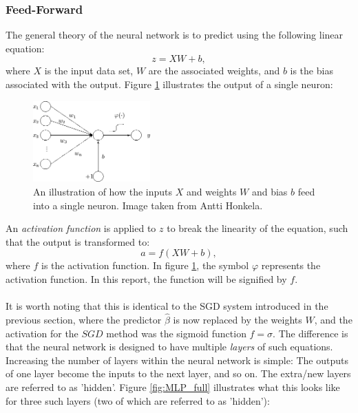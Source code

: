         \subsubsection{Feed-Forward}
            The general theory of the neural network is to predict using the following linear equation:
            \begin{equation}\label{eq:z1}
                z = X W + b,
            \end{equation}
            where $X$ is the input data set, $W$ are the associated weights, and $b$ is the bias associated with the output. Figure \ref{fig:MLP_conc} illustrates the output of a single neuron:
            \begin{figure}[H]
                \centering
                \includegraphics[width=0.4\textwidth]{figures/MLP.png}
                \caption{An illustration of how the inputs $X$ and weights $W$ and bias $b$ feed into a single neuron. Image taken from Antti Honkela.}
                \label{fig:MLP_conc}
            \end{figure}
            An \textit{activation function} is applied to $z$ to break the linearity of the equation, such that the output is transformed to:
            \begin{equation}\label{eq:a1}
                a = f\left( X W + b \right),
            \end{equation}
            where $f$ is the activation function. In figure \ref{fig:MLP_conc}, the symbol $\varphi$ represents the activation function. In this report, the function will be signified by $f$.\\\\
            It is worth noting that this is identical to the SGD system introduced in the previous section, where the predictor $\hat{\beta}$ is now replaced by the weights $W$, and the activation for the $SGD$ method was the sigmoid function $f=\sigma$. The difference is that the neural network is designed to have multiple \textit{layers} of such equations. Increasing the number of layers within the neural network is simple: The outputs of one layer become the inputs to the next layer, and so on. The extra/new layers are referred to as 'hidden'. Figure \ref{fig:MLP_full} illustrates what this looks like for three such layers (two of which are referred to as 'hidden'):
